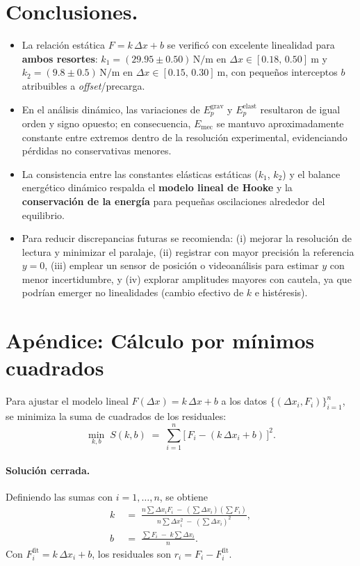 \documentclass[11pt,twocolumn]{article}
\begin{document}

\section{Conclusiones.}
\begin{itemize}[leftmargin=*,itemsep=2pt,topsep=2pt]
    \item La relación estática $F=k\,\Delta x+b$ se verificó con excelente linealidad para \textbf{ambos resortes}: 
    $k_1=(29.95\pm0.50)\,\mathrm{N/m}$ en $\Delta x\in[0.18,\,0.50]~\mathrm{m}$ y 
    $k_2=(9.8\pm0.5)\,\mathrm{N/m}$ en $\Delta x\in[0.15,\,0.30]~\mathrm{m}$, con pequeños interceptos $b$ atribuibles a \emph{offset}/precarga.
    \item En el análisis dinámico, las variaciones de $E_p^{\text{grav}}$ y $E_p^{\text{elast}}$ resultaron de igual orden y signo opuesto; 
    en consecuencia, $E_{\text{mec}}$ se mantuvo aproximadamente constante entre extremos dentro de la resolución experimental, 
    evidenciando pérdidas no conservativas menores.
    \item La consistencia entre las constantes elásticas estáticas ($k_1$, $k_2$) y el balance energético dinámico respalda el \textbf{modelo lineal de Hooke} y la \textbf{conservación de la energía} para pequeñas oscilaciones alrededor del equilibrio.
    \item Para reducir discrepancias futuras se recomienda: (i) mejorar la resolución de lectura y minimizar el paralaje, 
    (ii) registrar con mayor precisión la referencia $y=0$, (iii) emplear un sensor de posición o videoanálisis para estimar $y$ con menor incertidumbre, 
    y (iv) explorar amplitudes mayores con cautela, ya que podrían emerger no linealidades (cambio efectivo de $k$ e histéresis).
\end{itemize}
\section{Apéndice: Cálculo por mínimos cuadrados}\label{sec:Apendice}

Para ajustar el modelo lineal $F(\Delta x)=k\,\Delta x + b$ a los datos $\{(\Delta x_i, F_i)\}_{i=1}^n$, se minimiza la suma de cuadrados de los residuales:
\[
\min_{k,b}\; S(k,b)\;=\;\sum_{i=1}^n \big[\,F_i - (k\,\Delta x_i + b)\,\big]^2.
\]

\paragraph{Solución cerrada.}
Definiendo las sumas con $i=1,\dots,n$, se obtiene
\begin{align*}
    k &\;=\; \frac{ n\sum \Delta x_i F_i \;-\; \left(\sum \Delta x_i\right)\!\left(\sum F_i\right) }{ n\sum \Delta x_i^2 \;-\; \left(\sum \Delta x_i\right)^2 },\\[6pt]
b &\;=\; \frac{ \sum F_i \;-\; k\sum \Delta x_i }{ n }.
\end{align*}
Con $F_i^{\text{fit}} = k\,\Delta x_i + b$, los residuales son $r_i = F_i - F_i^{\text{fit}}$.
\end{document}
